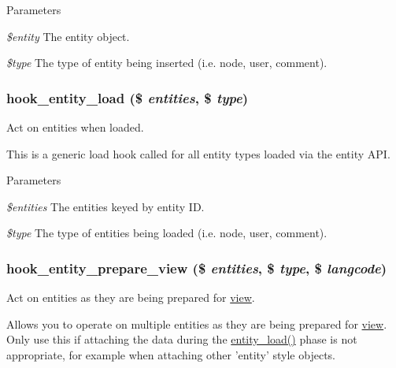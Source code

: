 \begin{DoxyParams}{Parameters}
\item[{\em \$entity}]The entity object. \item[{\em \$type}]The type of entity being inserted (i.e. node, user, comment). \end{DoxyParams}
\hypertarget{group__hooks_ga1f594647c8cbb27f75b77cc4118da8d6}{
\subsubsection[{hook\_\-entity\_\-load}]{\setlength{\rightskip}{0pt plus 5cm}hook\_\-entity\_\-load (\$ {\em entities}, \/  \$ {\em type})}}
\label{group__hooks_ga1f594647c8cbb27f75b77cc4118da8d6}
Act on entities when loaded.

This is a generic load hook called for all entity types loaded via the entity API.


\begin{DoxyParams}{Parameters}
\item[{\em \$entities}]The entities keyed by entity ID. \item[{\em \$type}]The type of entities being loaded (i.e. node, user, comment). \end{DoxyParams}
\hypertarget{group__hooks_ga7e60ef817e60b20497bda315d2f30163}{
\subsubsection[{hook\_\-entity\_\-prepare\_\-view}]{\setlength{\rightskip}{0pt plus 5cm}hook\_\-entity\_\-prepare\_\-view (\$ {\em entities}, \/  \$ {\em type}, \/  \$ {\em langcode})}}
\label{group__hooks_ga7e60ef817e60b20497bda315d2f30163}
Act on entities as they are being prepared for \hyperlink{classview}{view}.

Allows you to operate on multiple entities as they are being prepared for \hyperlink{classview}{view}. Only use this if attaching the data during the \hyperlink{common_8inc_a78b89cf93f9710a68d02f86adccf1898}{entity\_\-load()} phase is not appropriate, for example when attaching other 'entity' style objects.


